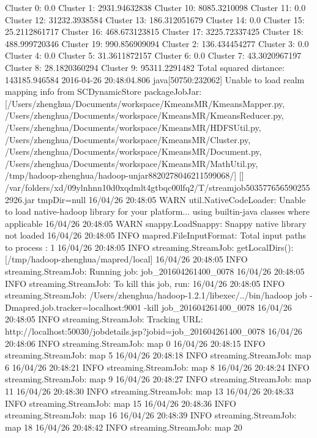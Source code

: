 Cluster 0: 0.0
Cluster 1: 2931.94632838
Cluster 10: 8085.3210098
Cluster 11: 0.0
Cluster 12: 31232.3938584
Cluster 13: 186.312051679
Cluster 14: 0.0
Cluster 15: 25.2112861717
Cluster 16: 468.673123815
Cluster 17: 3225.72337425
Cluster 18: 488.999720346
Cluster 19: 990.856909094
Cluster 2: 136.434454277
Cluster 3: 0.0
Cluster 4: 0.0
Cluster 5: 31.3611872157
Cluster 6: 0.0
Cluster 7: 43.3020967197
Cluster 8: 28.1820360294
Cluster 9: 95311.2291482
Total squared distance: 143185.946584
2016-04-26 20:48:04.806 java[50750:232062] Unable to load realm mapping info from SCDynamicStore
packageJobJar: [/Users/zhenghua/Documents/workspace/KmeansMR/KmeansMapper.py, /Users/zhenghua/Documents/workspace/KmeansMR/KmeansReducer.py, /Users/zhenghua/Documents/workspace/KmeansMR/HDFSUtil.py, /Users/zhenghua/Documents/workspace/KmeansMR/Cluster.py, /Users/zhenghua/Documents/workspace/KmeansMR/Document.py, /Users/zhenghua/Documents/workspace/KmeansMR/MathUtil.py, /tmp/hadoop-zhenghua/hadoop-unjar8820278046211599068/] [] /var/folders/xd/09ylnhnn10d0xqdmlt4gtbqc00lfq2/T/streamjob5035776565902552926.jar tmpDir=null
16/04/26 20:48:05 WARN util.NativeCodeLoader: Unable to load native-hadoop library for your platform... using builtin-java classes where applicable
16/04/26 20:48:05 WARN snappy.LoadSnappy: Snappy native library not loaded
16/04/26 20:48:05 INFO mapred.FileInputFormat: Total input paths to process : 1
16/04/26 20:48:05 INFO streaming.StreamJob: getLocalDirs(): [/tmp/hadoop-zhenghua/mapred/local]
16/04/26 20:48:05 INFO streaming.StreamJob: Running job: job_201604261400_0078
16/04/26 20:48:05 INFO streaming.StreamJob: To kill this job, run:
16/04/26 20:48:05 INFO streaming.StreamJob: /Users/zhenghua/hadoop-1.2.1/libexec/../bin/hadoop job  -Dmapred.job.tracker=localhost:9001 -kill job_201604261400_0078
16/04/26 20:48:05 INFO streaming.StreamJob: Tracking URL: http://localhost:50030/jobdetails.jsp?jobid=job_201604261400_0078
16/04/26 20:48:06 INFO streaming.StreamJob:  map 0%
16/04/26 20:48:15 INFO streaming.StreamJob:  map 5%
16/04/26 20:48:18 INFO streaming.StreamJob:  map 6%
16/04/26 20:48:21 INFO streaming.StreamJob:  map 8%
16/04/26 20:48:24 INFO streaming.StreamJob:  map 9%
16/04/26 20:48:27 INFO streaming.StreamJob:  map 11%
16/04/26 20:48:30 INFO streaming.StreamJob:  map 13%
16/04/26 20:48:33 INFO streaming.StreamJob:  map 15%
16/04/26 20:48:36 INFO streaming.StreamJob:  map 16%
16/04/26 20:48:39 INFO streaming.StreamJob:  map 18%
16/04/26 20:48:42 INFO streaming.StreamJob:  map 20%
